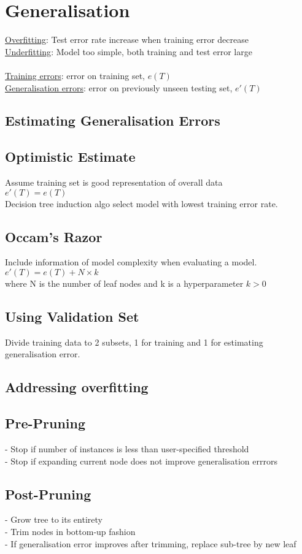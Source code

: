 \section{Generalisation}
\underline{Overfitting}: Test error rate increase when training error decrease\\
\underline{Underfitting}: Model too simple, both training and test error large\\
\\
\underline{Training errors}: error on training set, $e(T)$\\
\underline{Generalisation errors}: error on previously unseen testing set, $e'(T)$\\
\subsection*{Estimating Generalisation Errors}
\subsection*{Optimistic Estimate}
Assume training set is good representation of overall data\\
$e'(T) = e(T)$\\
Decision tree induction algo select model with lowest training error rate.\\
\subsection*{Occam's Razor}
Include information of model complexity when evaluating a model.\\
$e'(T) = e(T) + N\times k$\\
where N is the number of leaf nodes and k is a hyperparameter $k > 0$
\subsection*{Using Validation Set}
Divide training data to 2 subsets, 1 for training and 1 for estimating
generalisation error.

\subsection*{Addressing overfitting}
\subsection*{Pre-Pruning}
- Stop if number of instances is less than user-specified threshold\\
- Stop if expanding current node does not improve generalisation errrors
\subsection*{Post-Pruning}
- Grow tree to its entirety\\
- Trim nodes in bottom-up fashion\\
- If generalisation error improves after trimming, replace sub-tree by new leaf\\